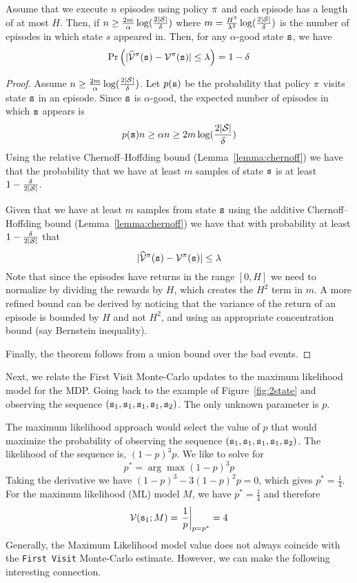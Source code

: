 \begin{theorem}
Assume that we execute $n$ episodes using policy $\pi$ and each 
episode has a length of at most $H$. Then, if $n\geq \frac{2m}{\alpha}\log(\frac{2|\mathcal{S}|}{\delta})$ where $m=\frac{H^2}{\lambda^2}\log(\frac{2|\mathcal{S}|}{\delta})$ is the number of episodes in which state $s$ appeared in. Then, for any $\alpha$-good state ${\tt s}$, we have
\[\Pr\left(|\widehat{\mathcal{V}}^\pi({\tt s})-\mathcal{V}^\pi({\tt s})|\leq
\lambda\right) = 1-\delta\]
\end{theorem}

\begin{proof}
Assume $n\geq \frac{2m}{\alpha}\log(\frac{2|\mathcal{S}|}{\delta})$.
Let $p({\tt s})$ be the probability that policy $\pi$ visits
state ${\tt s}$ in an episode. Since ${\tt s}$ is $\alpha$-good, the
expected number of episodes in which ${\tt s}$ appears is
\[p({\tt s})n\geq \alpha n \geq 2m\log(\frac{2|\mathcal{S}|}{\delta})\]
Using the relative Chernoff--Hoffding bound (Lemma~\ref{lemma:chernoff}) we have that
the probability that we have at least $m$ samples of state ${\tt s}$
is at least $1-\frac{\delta}{2|\mathcal{S}|}$.

Given that we have at least $m$ samples from state ${\tt s}$ using
the additive Chernoff--Hoffding bound (Lemma~\ref{lemma:chernoff})
we have that with probability at least $1-\frac{\delta}{2|\mathcal{S}|}$ that
\[|\widehat{\mathcal{V}}^\pi({\tt s})-\mathcal{V}^\pi({\tt s})|\leq
\lambda\]
Note that since the episodes have returns in the range $[0,H]$ we need
to normalize by dividing the rewards by $H$, which creates the $H^2$
term in $m$. A more refined bound can be derived by noticing that the 
variance of the return of an episode is bounded by $H$ and not
$H^2$, and using an appropriate concentration bound (say Bernstein inequality).

Finally, the theorem follows from a union bound over the bad events.
\end{proof}

Next, we relate the First Visit Monte-Carlo updates to the maximum
likelihood model for the MDP. Going back to the example of
Figure~\ref{fig:2state} and observing the sequence
$({\tt s}_1,{\tt s}_1,{\tt s}_1,{\tt s}_1,{\tt s}_2)$. The only unknown
parameter is $p$.

The maximum likelihood approach would select the value of $p$ that
would maximize the probability of observing the sequence
$({\tt s}_1,{\tt s}_1,{\tt s}_1,{\tt s}_1,{\tt s}_2)$. The likelihood of
the sequence is, $(1-p)^3p$. We like to solve for
\[
p^* = \arg\max (1-p)^3 p
\]
Taking the derivative we have $(1-p)^3-3(1-p)^2p=0$, which gives
$p^*=\frac{1}{4}$.
%
For the maximum likelihood (ML) model $M$, we have $p^*=\frac{1}{4}$ and
therefore \[\mathcal{V}({\tt s}_1;M)=\left.\frac{1}{p}\right|_{p=p^{*}}=4\]
Generally, the Maximum Likelihood model value does not always
coincide with the {\tt First Visit} Monte-Carlo estimate. However, we
can make the following interesting connection.


